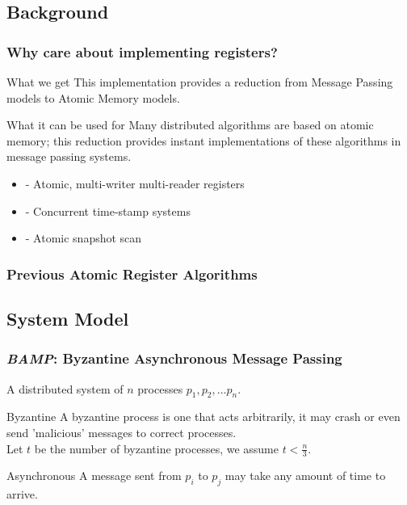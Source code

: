 \subsection{Background}
\begin{frame}
    \frametitle{Why care about implementing registers?}
    \begin{block}{What we get}
        This implementation provides a reduction from Message Passing models to Atomic Memory models.
    \end{block}
    \begin{block}{What it can be used for}
        Many distributed algorithms are based on atomic memory; this reduction provides instant implementations
        of these algorithms in message passing systems.
    \end{block}
    \begin{examples}
        \begin{itemize}
            \item - Atomic, multi-writer multi-reader registers 
            \item - Concurrent time-stamp systems
            \item - Atomic snapshot scan
        \end{itemize}
    \end{examples}
\end{frame}

\begin{frame}
    \frametitle{Previous Atomic Register Algorithms}
\end{frame}

\subsection{System Model}
\begin{frame}
    \frametitle{\emph{BAMP}: Byzantine Asynchronous Message Passing}
    A distributed system of $n$ processes $p_1, p_2, ... p_n$.
    \begin{block}{Byzantine}
        A byzantine process is one that acts arbitrarily, it may crash or even
        send 'malicious' messages to correct processes.\\
        Let $t$ be the number of byzantine processes, we assume $t<\frac{n}{3}$.
    \end{block}
    \begin{block}{Asynchronous}
        A message sent from $p_i$ to $p_j$ may take any amount of time to arrive.
    \end{block}
\end{frame}

